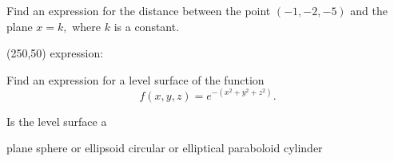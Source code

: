 \documentclass[12pt,letterpaper,noanswers]{exam}
\begin{document}
 \pdfpageheight 11in 
  \pdfpagewidth 8.5in


\begin{questions}
\item Find an expression for the distance between the point $(-1,-2,-5)$ and the plane $x = k,$ where $k$ is a constant.

\vfill

\framebox(250,50){ expression:\hfill }

\item Find an expression for a level surface of the function \[f(x,y,z) = e^{-(x^2+y^2+z^2)}.\]

Is the level surface a 

\begin{oneparcheckboxes}
\choice plane
\choice sphere or ellipsoid
\choice circular or elliptical paraboloid
\choice cylinder
\end{oneparcheckboxes}

\vfill
\end{questions}
\end{document}
